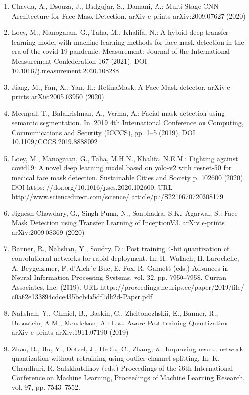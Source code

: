 \documentclass[12pt,a4paper]{article}
\begin{document}
\begin{enumerate}
\item Chavda, A., Dsouza, J., Badgujar, S., Damani, A.: Multi-Stage CNN Architecture
for Face Mask Detection. arXiv e-prints arXiv:2009.07627 (2020)
\item Loey, M., Manogaran, G., Taha, M., Khalifa, N.: A hybrid deep transfer learning model with machine learning methods for face mask detection in the era of
the covid-19 pandemic. Measurement: Journal of the International Measurement
Confederation 167 (2021). DOI 10.1016/j.measurement.2020.108288
\item Jiang, M., Fan, X., Yan, H.: RetinaMask: A Face Mask detector. arXiv e-prints
arXiv:2005.03950 (2020)
\item Meenpal, T., Balakrishnan, A., Verma, A.: Facial mask detection using semantic
segmentation. In: 2019 4th International Conference on Computing, Communications and Security (ICCCS), pp. 1–5 (2019). DOI 10.1109/CCCS.2019.8888092
\item Loey, M., Manogaran, G., Taha, M.H.N., Khalifa, N.E.M.: Fighting against covid19: A novel deep learning model based on yolo-v2 with resnet-50 for medical face
mask detection. Sustainable Cities and Society p. 102600 (2020). DOI https:
//doi.org/10.1016/j.scs.2020.102600. URL http://www.sciencedirect.com/science/
article/pii/S2210670720308179
\item Jignesh Chowdary, G., Singh Punn, N., Sonbhadra, S.K., Agarwal, S.: Face Mask
Detection using Transfer Learning of InceptionV3. arXiv e-prints arXiv:2009.08369
(2020)
\item Banner, R., Nahshan, Y., Soudry, D.: Post training 4-bit quantization of convolutional networks for rapid-deployment. In: H. Wallach, H. Larochelle,
A. Beygelzimer, F. d'Alch´e-Buc, E. Fox, R. Garnett (eds.) Advances in
Neural Information Processing Systems, vol. 32, pp. 7950–7958. Curran Associates, Inc. (2019). URL https://proceedings.neurips.cc/paper/2019/file/
c0a62e133894cdce435bcb4a5df1db2d-Paper.pdf
\item Nahshan, Y., Chmiel, B., Baskin, C., Zheltonozhskii, E., Banner, R., Bronstein,
A.M., Mendelson, A.: Loss Aware Post-training Quantization. arXiv e-prints
arXiv:1911.07190 (2019)
\item Zhao, R., Hu, Y., Dotzel, J., De Sa, C., Zhang, Z.: Improving neural network
quantization without retraining using outlier channel splitting. In: K. Chaudhuri,
R. Salakhutdinov (eds.) Proceedings of the 36th International Conference on Machine Learning, Proceedings of Machine Learning Research, vol. 97, pp. 7543–7552.

\end{enumerate}
\end{document}
